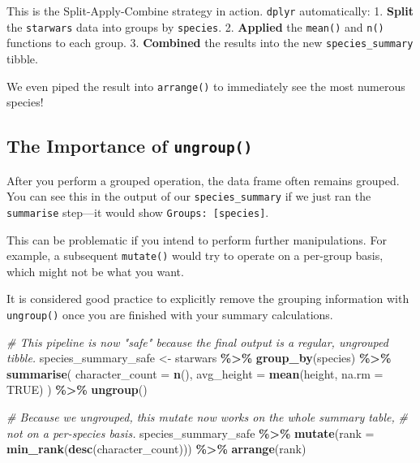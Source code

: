 \documentclass[
  11pt,
]{article}
\newenvironment{Shaded}{\begin{snugshade}}{\end{snugshade}}
\newcommand{\AttributeTok}[1]{\textcolor[rgb]{0.13,0.29,0.53}{#1}}
\newcommand{\CommentTok}[1]{\textcolor[rgb]{0.56,0.35,0.01}{\textit{#1}}}
\newcommand{\ConstantTok}[1]{\textcolor[rgb]{0.56,0.35,0.01}{#1}}
\newcommand{\FunctionTok}[1]{\textcolor[rgb]{0.13,0.29,0.53}{\textbf{#1}}}
\newcommand{\NormalTok}[1]{#1}
\newcommand{\OtherTok}[1]{\textcolor[rgb]{0.56,0.35,0.01}{#1}}
\newcommand{\SpecialCharTok}[1]{\textcolor[rgb]{0.81,0.36,0.00}{\textbf{#1}}}
\begin{document}
This is the Split-Apply-Combine strategy in action. \texttt{dplyr}
automatically: 1. \textbf{Split} the \texttt{starwars} data into groups
by \texttt{species}. 2. \textbf{Applied} the \texttt{mean()} and
\texttt{n()} functions to each group. 3. \textbf{Combined} the results
into the new \texttt{species\_summary} tibble.

We even piped the result into \texttt{arrange()} to immediately see the
most numerous species!

\subsection{\texorpdfstring{The Importance of
\texttt{ungroup()}}{The Importance of ungroup()}}\label{the-importance-of-ungroup}

After you perform a grouped operation, the data frame often remains
grouped. You can see this in the output of our \texttt{species\_summary}
if we just ran the \texttt{summarise} step---it would show
\texttt{Groups:\ {[}species{]}}.

This can be problematic if you intend to perform further manipulations.
For example, a subsequent \texttt{mutate()} would try to operate on a
per-group basis, which might not be what you want.

It is considered good practice to explicitly remove the grouping
information with \texttt{ungroup()} once you are finished with your
summary calculations.

\begin{Shaded}
\begin{Highlighting}[]
\CommentTok{\# This pipeline is now "safe" because the final output is a regular, ungrouped tibble.}
\NormalTok{species\_summary\_safe }\OtherTok{\textless{}{-}}\NormalTok{ starwars }\SpecialCharTok{\%\textgreater{}\%}
  \FunctionTok{group\_by}\NormalTok{(species) }\SpecialCharTok{\%\textgreater{}\%}
  \FunctionTok{summarise}\NormalTok{(}
    \AttributeTok{character\_count =} \FunctionTok{n}\NormalTok{(),}
    \AttributeTok{avg\_height =} \FunctionTok{mean}\NormalTok{(height, }\AttributeTok{na.rm =} \ConstantTok{TRUE}\NormalTok{)}
\NormalTok{  ) }\SpecialCharTok{\%\textgreater{}\%}
  \FunctionTok{ungroup}\NormalTok{()}

\CommentTok{\# Because we ungrouped, this mutate now works on the whole summary table,}
\CommentTok{\# not on a per{-}species basis.}
\NormalTok{species\_summary\_safe }\SpecialCharTok{\%\textgreater{}\%}
  \FunctionTok{mutate}\NormalTok{(}\AttributeTok{rank =} \FunctionTok{min\_rank}\NormalTok{(}\FunctionTok{desc}\NormalTok{(character\_count))) }\SpecialCharTok{\%\textgreater{}\%}
  \FunctionTok{arrange}\NormalTok{(rank)}
\end{Highlighting}
\end{Shaded}
\end{document}
